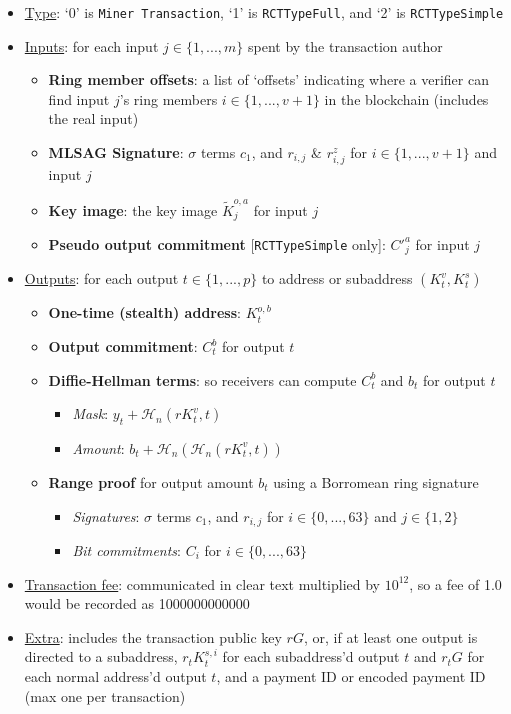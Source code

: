 \begin{itemize}
    \item \underline{Type}: `0' is {\tt Miner Transaction}, `1' is {\tt RCTTypeFull}, and `2' is {\tt RCTTypeSimple} %
    \item \underline{Inputs}: for each input $j \in \{1,...,m\}$ spent by the transaction author
    \begin{itemize}
        \item \textbf{Ring member offsets}: a list of `offsets' indicating where a verifier can find input $j$'s ring members $i \in \{1,...,v+1\}$ in the blockchain (includes the real input)
        \item \textbf{MLSAG Signature}: $\sigma$ terms $c_1$, and $r_{i,j}$ \& $r^{z}_{i,j}$ for $i \in \{1,...,v+1\}$ and input $j$
        \item \textbf{Key image}: the key image $\tilde{K}^{o,a}_j$ for input $j$
        \item \textbf{Pseudo output commitment} {[{\tt RCTTypeSimple} only]}: $C'^{a}_j$ for input $j$
    \end{itemize}
    
    \item \underline{Outputs}: for each output $t \in \{1,...,p\}$ to address or subaddress $(K^v_t,K^s_t)$
    \begin{itemize}
        \item \textbf{One-time (stealth) address}: $K^{o,b}_t$
        \item \textbf{Output commitment}: $C^{b}_t$ for output $t$
        \item \textbf{Diffie-Hellman terms}: so receivers can compute $C^{b}_t$ and $b_t$ for output $t$
        \begin{itemize}
            \item \textit{Mask}: $y_t + \mathcal{H}_n(r K^v_t,t)$
            \item \textit{Amount}: $b_t + \mathcal{H}_n(\mathcal{H}_n(r K^v_t,t))$
        \end{itemize}
        \item \textbf{Range proof} for output amount $b_t$ using a Borromean ring signature
        \begin{itemize}
            \item \textit{Signatures}: $\sigma$ terms $c_1$, and $r_{i,j}$ for $i \in \{0,...,63\}$ and $j \in \{1,2\}$
            \item \textit{Bit commitments}: $C_i$ for $i \in \{0,...,63\}$
        \end{itemize}
    \end{itemize}
    \item \underline{Transaction fee}: communicated in clear text multiplied by $10^{12}$, so a fee of 1.0 would be recorded as 1000000000000
    \item \underline{Extra}: includes the transaction public key $r G$, or, if at least one output is directed to a subaddress, $r_t K^{s,i}_t$ for each subaddress'd output $t$ and $r_t G$ for each normal address'd output $t$, and a payment ID or encoded payment ID (max one per transaction)
\end{itemize}

